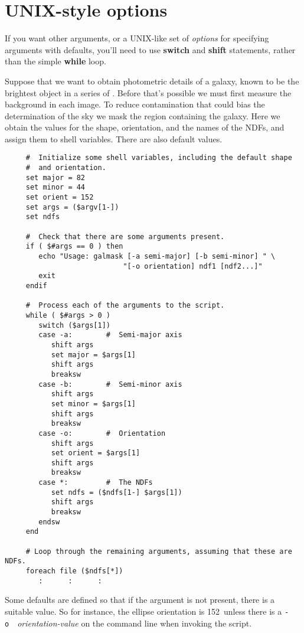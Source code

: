 \newpage
\section{UNIX-style options
\label{sc4_se_unix_options}}

If you want other arguments, or a UNIX-like set of {\em options\/}
for specifying arguments with defaults, you'll need to use {\bf switch}
and {\bf shift} statements, rather than the simple {\bf while} loop.

Suppose that we want to obtain photometric details of a galaxy, known
to be the brightest object in a series of .  Before
that's possible we must first measure the background in each image.
To reduce contamination that could bias the determination of the sky
we mask the region containing the galaxy.  Here we obtain the values
for the shape, orientation, and the names of the NDFs, and assign them
to shell variables.  There are also default values.

\small
\begin{verbatim}
     #  Initialize some shell variables, including the default shape
     #  and orientation.
     set major = 82
     set minor = 44
     set orient = 152
     set args = ($argv[1-])
     set ndfs

     #  Check that there are some arguments present.
     if ( $#args == 0 ) then
        echo "Usage: galmask [-a semi-major] [-b semi-minor] " \
                            "[-o orientation] ndf1 [ndf2...]"
        exit
     endif

     #  Process each of the arguments to the script.
     while ( $#args > 0 )
        switch ($args[1])
        case -a:        #  Semi-major axis
           shift args
           set major = $args[1]
           shift args
           breaksw
        case -b:        #  Semi-minor axis
           shift args
           set minor = $args[1]
           shift args
           breaksw
        case -o:        #  Orientation
           shift args
           set orient = $args[1]
           shift args
           breaksw
        case *:         #  The NDFs
           set ndfs = ($ndfs[1-] $args[1])
           shift args
           breaksw
        endsw
     end

     # Loop through the remaining arguments, assuming that these are NDFs.
     foreach file ($ndfs[*])
        :      :      :
\end{verbatim}
\normalsize
Some defaults are defined so that if the argument is not present,
there is a suitable value.  So for instance, the ellipse orientation
is 152\dgs\ unless there is a \mbox{{\tt -o} {\em
orientation-value\/}} on the command line when invoking the script.

